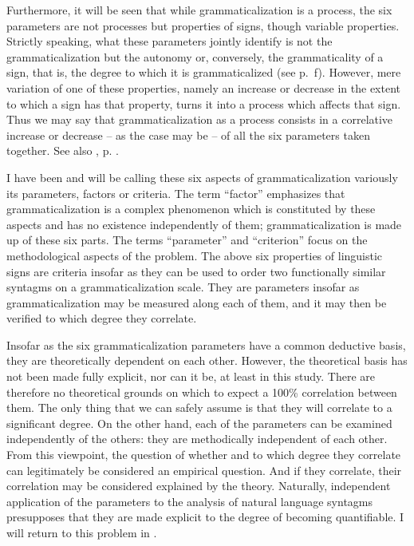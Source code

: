 Furthermore, it will be seen that while grammaticalization is a process, the six parameters are not processes but properties of signs, though variable properties. Strictly speaking, what these parameters jointly identify is not the grammaticalization but the autonomy or, conversely, the grammaticality of a sign, that is, the degree to which it is grammaticalized (see p.~\pageref{page11}f). \chk%
However, mere variation of one of these properties, namely an increase or decrease in the extent to which a sign has that property, turns it into a process which affects that sign. Thus we may say that grammaticalization as a process consists in a correlative increase or decrease -- as the case may be -- of all the six parameters taken together. See also , p. \pageref{T6}.

I have been and will be calling these six aspects of grammaticalization variously its parameters, factors or criteria. The term ``factor'' emphasizes that grammaticalization is a complex phenomenon which is constituted by these aspects and has no existence independently of them; grammaticalization is made up of these six parts. The terms ``parameter'' and ``criterion'' focus on the methodological aspects of the problem. The above six properties of linguistic signs are criteria insofar as they can be used to order two functionally similar syntagms on a grammaticalization scale. They are parameters insofar as grammaticalization may be measured along each of them, and it may then be verified to which degree they correlate.

Insofar as the six grammaticalization parameters have a common deductive basis, they are theoretically dependent on each other. However, the theoretical basis has not been made fully explicit, nor can it be, at least in this study. There are therefore no theoretical grounds on which to expect a 100\% correlation between them. The only thing that we can safely assume is that they will correlate to a significant degree. On the other hand, each of the parameters can be examined independently of the others: they are methodically independent of each other. From this viewpoint, the question of whether and to which degree they correlate can legitimately be considered an empirical question. And if they correlate, their correlation may be considered explained by the theory. Naturally, independent application of the parameters to the analysis of natural language syntagms presupposes that they are made explicit to the degree of becoming quantifiable. I will return to this problem in .

